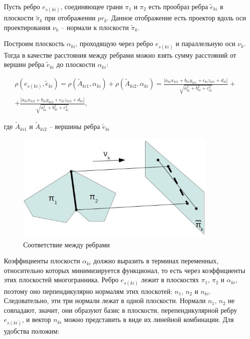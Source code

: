 \documentclass[a4paper,12pt, titlepage]{article}
\begin{document}
\begin{flushleft}
 Пусть ребро $e_{s(ki)}$, соединяющее грани $\pi_{1}$ и $\pi_{2}$ 
 есть прообраз ребра $\tilde{e}_{ki}$ 
 в плоскости $\tilde{\pi}_{k}$ при отображении $pr_{k}$.  Данное отображение есть проектор
 вдоль оси проектирования $\nu_{k}$ -- нормали к плоскости $\tilde{\pi}_{k}$. 
 
 Построим плоскость $\alpha_{ki}$, проходящую через ребро  
 $e_{s(ki)}$ и параллельную оси $\nu_{k}$.
 Тогда в качестве расстояния между ребрами можно взять сумму расстояний от вершин ребра
 $\tilde{e}_{ki}$ до плоскости $\alpha_{ki}$:


 \begin{multline}
  \rho(e_{s(ki)}, \tilde{e}_{ki}) = \rho (\tilde{A}_{ki1}, \alpha_{ki}) + 
  \rho (\tilde{A}_{ki2}, \alpha_{ki}) = 
  \frac{|a_{ki} x_{ki1} + b_{ki} y_{ki1} + c_{ki} z_{ki1} + d_{ki}|}
  {\sqrt{a_{ki}^{2} + b_{ki}^{2} + c_{ki}^{2}}} + \\ +
  \frac{|a_{ki} x_{ki2} + b_{ki} y_{ki2} + c_{ki} z_{ki2} + d_{ki}|}
  {\sqrt{a_{ki}^{2} + b_{ki}^{2} + c_{ki}^{2}}},
 \end{multline}
 
 где $\tilde{A}_{ki1}$ и $\tilde{A}_{ki2}$ -- вершины ребра $\tilde{e}_{ki}$
\end{flushleft}

\begin{flushleft}
  \begin{figure}[ht]
    \includegraphics[clip, width=10cm]{pi1pi2.jpg}
    \caption{Соответствие между ребрами}\label{pi1pi2}
  \end{figure}
\end{flushleft}

\begin{flushleft}
 Коэффициенты плоскости $\alpha_{ki}$ должно выразить в терминах переменных, относительно
 которых минимизируется функционал, то есть через коэффициенты этих плоскостей многогранника. 
 Ребро $e_{s(ki)}$ лежит в плоскостях $\pi_{1}$, $\pi_{2}$ и $\alpha_{ki}$, поэтому оно
 перпендикулярно нормалям этих плоскотей: $n_{1}$, $n_{2}$ и $n_{ki}$. Следовательно, эти 
 три нормали лежат в одной плоскости. Нормали $n_{1}$, $n_{2}$ не совпадают, значит, они 
 образуют базис в плоскости, перепендикулярной ребру $e_{s(ki)}$, и вектор $n_{ki}$ можно
 представить в виде их линейной комбинации. Для удобства положим:
\end{flushleft}
\end{document}
